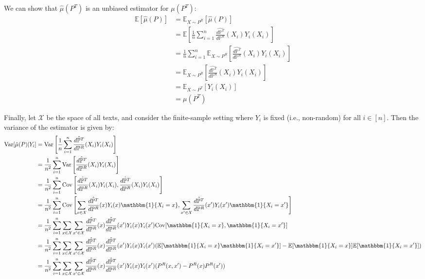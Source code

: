 \documentclass{article}
\begin{document}
We can show that $\hat{\mu}(P^T)$ is an unbiased estimator for $\mu(P^T)$:
\begin{align*}
    \mathbb{E}[\hat{\mu}(P)] &= \mathbb{E}_{X \sim P^R}[\hat{\mu}(P)] \\
    &= \mathbb{E}\left[\frac{1}{n} \sum_{i=1}^n \frac{\hat{d \mathbb{P}^T}}{d \mathbb{P}^R}(X_i)Y_i(X_i)\right] \\
    &=\frac{1}{n}\sum_{i=1}^n \mathbb{E}_{X \sim P^R}\left[\frac{\hat{d \mathbb{P}^T}}{d \mathbb{P}^R}(X_i)Y_i(X_i)\right] \\
    &= \mathbb{E}_{X \sim P^R}\left[\frac{\hat{d \mathbb{P}^T}}{d \mathbb{P}^R}(X_i)Y_i(X_i)\right] \\
    &=\mathbb{E}_{X \sim P^T}[Y_i(X_i)] \\
    &= \mu(P^T)
\end{align*}

Finally, let $\mathcal{X}$ be the space of all texts, and consider the finite-sample setting where $Y_i$ is fixed (i.e., non-random) for all $i \in [n]$. Then the variance of the estimator is given by:
\begin{align*}
    \text{Var}[\hat{\mu}(P)|Y_i] &= \text{Var}\left[\frac{1}{n}\sum_{i=1}^n \frac{\hat{d \mathbb{P}^T}}{d \mathbb{P}^R}(X_i)Y_i(X_i) \right] \\
    &= \frac{1}{n^2}\sum_{i=1}^n\text{Var}\left[\frac{\hat{d \mathbb{P}^T}}{d \mathbb{P}^R}(X_i)Y_i(X_i)\right] \\
    &= \frac{1}{n^2}\sum_{i=1}^n\text{Cov}\left[\frac{\hat{d \mathbb{P}^T}}{d \mathbb{P}^R}(X_i)Y_i(X_i), \frac{\hat{d \mathbb{P}^T}}{d \mathbb{P}^R}(X_i)Y_i(X_i)\right] \\    
    &= \frac{1}{n^2}\sum_{i=1}^n\text{Cov}\left[\sum_{x \in \mathcal{X}}\frac{\hat{d \mathbb{P}^T}}{d \mathbb{P}^R}(x)Y_i(x) \mathbbm{1}\{X_i=x\}, \sum_{x' \in \mathcal{X}}\frac{\hat{d \mathbb{P}^T}}{d \mathbb{P}^R}(x')Y_i(x')\mathbbm{1}\{X_i=x'\}\right] \\
    &= \frac{1}{n^2}\sum_{i=1}^n\sum_{x \in \mathcal{X}}\sum_{x' \in \mathcal{X}} \frac{\hat{d \mathbb{P}^T}}{d \mathbb{P}^R}(x) \frac{\hat{d \mathbb{P}^T}}{d \mathbb{P}^R}(x')Y_i(x)Y_i(x')\text{Cov}[\mathbbm{1}\{X_i=x\},\mathbbm{1}\{X_i=x'\}] \\
    &=\frac{1}{n^2}\sum_{i=1}^n\sum_{x \in \mathcal{X}}\sum_{x' \in \mathcal{X}} \frac{\hat{d \mathbb{P}^T}}{d \mathbb{P}^R}(x) \frac{\hat{d \mathbb{P}^T}}{d \mathbb{P}^R}(x')Y_i(x)Y_i(x')(\mathbb{E}[\mathbbm{1}\{X_i=x\}\mathbbm{1}\{X_i=x'\}]-\mathbb{E}[\mathbbm{1}\{X_i=x\}]\mathbb{E}[\mathbbm{1}\{X_i=x'\}]) \\
    &=\frac{1}{n^2}\sum_{i=1}^n\sum_{x \in \mathcal{X}}\sum_{x' \in \mathcal{X}} \frac{\hat{d \mathbb{P}^T}}{d \mathbb{P}^R}(x) \frac{\hat{d \mathbb{P}^T}}{d \mathbb{P}^R}(x')Y_i(x)Y_i(x')(P^R(x,x')-P^R(x)P^R(x'))
\end{align*}
\end{document}
